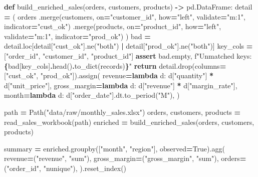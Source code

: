 \documentclass[
  12pt,
]{article}
\newenvironment{Shaded}{\begin{snugshade}}{\end{snugshade}}
\newcommand{\ControlFlowTok}[1]{\textcolor[rgb]{0.13,0.29,0.53}{\textbf{#1}}}
\newcommand{\KeywordTok}[1]{\textcolor[rgb]{0.13,0.29,0.53}{\textbf{#1}}}
\newcommand{\NormalTok}[1]{#1}
\newcommand{\OperatorTok}[1]{\textcolor[rgb]{0.81,0.36,0.00}{\textbf{#1}}}
\newcommand{\SpecialCharTok}[1]{\textcolor[rgb]{0.81,0.36,0.00}{\textbf{#1}}}
\newcommand{\SpecialStringTok}[1]{\textcolor[rgb]{0.31,0.60,0.02}{#1}}
\newcommand{\StringTok}[1]{\textcolor[rgb]{0.31,0.60,0.02}{#1}}
\newcommand{\VariableTok}[1]{\textcolor[rgb]{0.00,0.00,0.00}{#1}}
\begin{document}
\begin{Shaded}
\begin{Highlighting}[]
\KeywordTok{def}\NormalTok{ build\_enriched\_sales(orders, customers, products) }\OperatorTok{{-}\textgreater{}}\NormalTok{ pd.DataFrame:}
\NormalTok{    detail }\OperatorTok{=}\NormalTok{ (}
\NormalTok{        orders}
\NormalTok{        .merge(customers, on}\OperatorTok{=}\StringTok{"customer\_id"}\NormalTok{, how}\OperatorTok{=}\StringTok{"left"}\NormalTok{, validate}\OperatorTok{=}\StringTok{"m:1"}\NormalTok{, indicator}\OperatorTok{=}\StringTok{"cust\_ok"}\NormalTok{)}
\NormalTok{        .merge(products, on}\OperatorTok{=}\StringTok{"product\_id"}\NormalTok{, how}\OperatorTok{=}\StringTok{"left"}\NormalTok{, validate}\OperatorTok{=}\StringTok{"m:1"}\NormalTok{, indicator}\OperatorTok{=}\StringTok{"prod\_ok"}\NormalTok{)}
\NormalTok{    )}
\NormalTok{    bad }\OperatorTok{=}\NormalTok{ detail.loc[detail[}\StringTok{"cust\_ok"}\NormalTok{].ne(}\StringTok{"both"}\NormalTok{) }\OperatorTok{|}\NormalTok{ detail[}\StringTok{"prod\_ok"}\NormalTok{].ne(}\StringTok{"both"}\NormalTok{)]}
\NormalTok{    key\_cols }\OperatorTok{=}\NormalTok{ [}\StringTok{"order\_id"}\NormalTok{, }\StringTok{"customer\_id"}\NormalTok{, }\StringTok{"product\_id"}\NormalTok{]}
    \ControlFlowTok{assert}\NormalTok{ bad.empty, }\SpecialStringTok{f"Unmatched keys: }\SpecialCharTok{\{}\NormalTok{bad[key\_cols]}\SpecialCharTok{.}\NormalTok{head()}\SpecialCharTok{.}\NormalTok{to\_dict(}\StringTok{\textquotesingle{}records\textquotesingle{}}\NormalTok{)}\SpecialCharTok{\}}\SpecialStringTok{"}
    \ControlFlowTok{return}\NormalTok{ detail.drop(columns}\OperatorTok{=}\NormalTok{[}\StringTok{"cust\_ok"}\NormalTok{, }\StringTok{"prod\_ok"}\NormalTok{]).assign(}
\NormalTok{        revenue}\OperatorTok{=}\KeywordTok{lambda}\NormalTok{ d: d[}\StringTok{"quantity"}\NormalTok{] }\OperatorTok{*}\NormalTok{ d[}\StringTok{"unit\_price"}\NormalTok{],}
\NormalTok{        gross\_margin}\OperatorTok{=}\KeywordTok{lambda}\NormalTok{ d: d[}\StringTok{"revenue"}\NormalTok{] }\OperatorTok{*}\NormalTok{ d[}\StringTok{"margin\_rate"}\NormalTok{],}
\NormalTok{        month}\OperatorTok{=}\KeywordTok{lambda}\NormalTok{ d: d[}\StringTok{"order\_date"}\NormalTok{].dt.to\_period(}\StringTok{"M"}\NormalTok{),}
\NormalTok{    )}

\NormalTok{path }\OperatorTok{=}\NormalTok{ Path(}\StringTok{"data/raw/monthly\_sales.xlsx"}\NormalTok{)}
\NormalTok{orders, customers, products }\OperatorTok{=}\NormalTok{ read\_sales\_workbook(path)}
\NormalTok{enriched }\OperatorTok{=}\NormalTok{ build\_enriched\_sales(orders, customers, products)}

\NormalTok{summary }\OperatorTok{=}\NormalTok{ enriched.groupby([}\StringTok{"month"}\NormalTok{, }\StringTok{"region"}\NormalTok{], observed}\OperatorTok{=}\VariableTok{True}\NormalTok{).agg(}
\NormalTok{    revenue}\OperatorTok{=}\NormalTok{(}\StringTok{"revenue"}\NormalTok{, }\StringTok{"sum"}\NormalTok{),}
\NormalTok{    gross\_margin}\OperatorTok{=}\NormalTok{(}\StringTok{"gross\_margin"}\NormalTok{, }\StringTok{"sum"}\NormalTok{),}
\NormalTok{    orders}\OperatorTok{=}\NormalTok{(}\StringTok{"order\_id"}\NormalTok{, }\StringTok{"nunique"}\NormalTok{),}
\NormalTok{).reset\_index()}


\end{Highlighting}
\end{Shaded}
\end{document}

